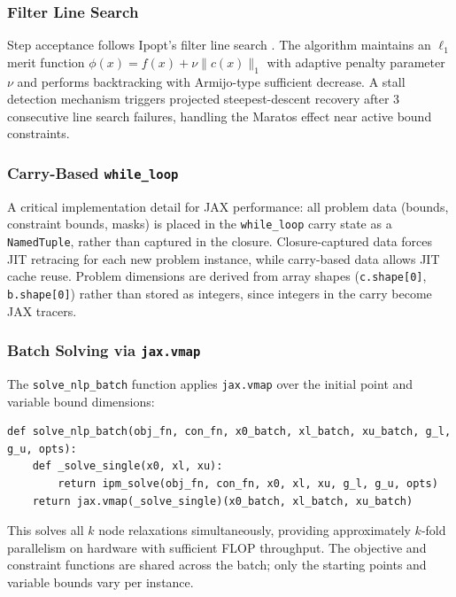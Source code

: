 \documentclass[12pt,preprint]{article}
\begin{document}
\subsubsection{Filter Line Search}
\label{org-filter-line-search}
Step acceptance follows Ipopt's filter line search \cite{Wachter2006}. The algorithm maintains an $\ell_1$ merit function $\phi(x) = f(x) + \nu \|c(x)\|_1$ with adaptive penalty parameter $\nu$ and performs backtracking with Armijo-type sufficient decrease. A stall detection mechanism triggers projected steepest-descent recovery after 3 consecutive line search failures, handling the Maratos effect near active bound constraints.

\subsubsection{Carry-Based \texttt{while\_loop}}
\label{org-carry-based-while-loop}
A critical implementation detail for JAX performance: all problem data (bounds, constraint bounds, masks) is placed in the \texttt{while\_loop} carry state as a \texttt{NamedTuple}, rather than captured in the closure. Closure-captured data forces JIT retracing for each new problem instance, while carry-based data allows JIT cache reuse. Problem dimensions are derived from array shapes (\texttt{c.shape[0]}, \texttt{b.shape[0]}) rather than stored as integers, since integers in the carry become JAX tracers.

\subsubsection{Batch Solving via \texttt{jax.vmap}}
\label{org-batch-solving-via-jax-vmap}
The \texttt{solve\_nlp\_batch} function applies \texttt{jax.vmap} over the initial point and variable bound dimensions:


\begin{verbatim}
def solve_nlp_batch(obj_fn, con_fn, x0_batch, xl_batch, xu_batch, g_l, g_u, opts):
    def _solve_single(x0, xl, xu):
        return ipm_solve(obj_fn, con_fn, x0, xl, xu, g_l, g_u, opts)
    return jax.vmap(_solve_single)(x0_batch, xl_batch, xu_batch)
\end{verbatim}

This solves all $k$ node relaxations simultaneously, providing approximately $k$-fold parallelism on hardware with sufficient FLOP throughput. The objective and constraint functions are shared across the batch; only the starting points and variable bounds vary per instance.
\end{document}
